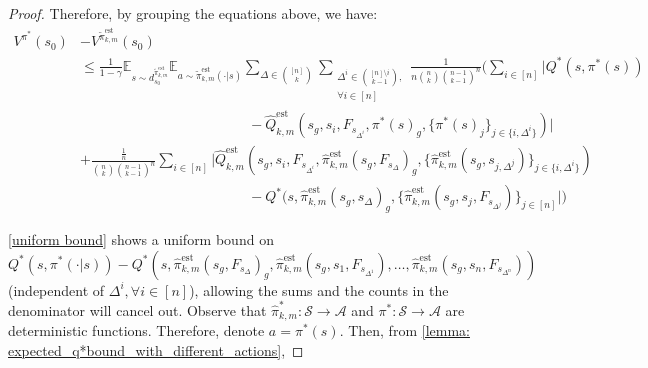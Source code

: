 \documentclass{article}
\theoremstyle{plain}
\theoremstyle{definition}
\def\est{\mathrm{est}}
\def\E{\mathbb{E}}
\begin{document}
\begin{proof}
Therefore, by grouping the equations above, we have:
\begin{align*}
    V^{\pi^*}(s_0) &- V^{\tilde{\pi}_{k,m}^\est}(s_0)\\
    &\leq \frac{1}{1-\gamma}\E_{s\sim d_{s_0}^{\tilde{\pi}_{k,m}^\est}}\E_{a\sim \tilde{\pi}_{k,m}^\est(\cdot|s)}\sum_{\Delta\in{[n]\choose k}}\sum_{\substack{\Delta^i \in {[n]\setminus i \choose k-1},\\ \forall i\in[n]}}\frac{1}{n {n\choose k} {n-1\choose k-1}^n}\bigg(\sum_{i\in[n]}\bigg|Q^*(s, \pi^*(s)) \\
    &\quad\quad\quad\quad\quad\quad\quad\quad\quad\quad\quad\quad - \hat{Q}^\est_{k,m}(s_g, s_{i},F_{s_{\Delta^i}}, \pi^*(s)_g, \{\pi^*(s)_j\}_{j\in\{i,\Delta^i\}})\bigg| \\
    &+ \frac{\frac{1}{n}}{{n\choose k} {n-1\choose k-1}^n}\sum_{i\in[n]}\bigg|\hat{Q}_{k,m}^\est(s_g, s_{i},F_{s_{\Delta^i}}, \hat{\pi}_{k,m}^\est(s_g,F_{s_\Delta})_g, \{\hat{\pi}_{k,m}^\est(s_g, s_{j,\Delta^j})\}_{j\in\{i,\Delta^i\}}) \\
    &\quad\quad\quad\quad\quad\quad\quad\quad\quad\quad\quad\quad- Q^*(s, \hat{\pi}_{k,m}^\est (s_g,s_\Delta)_g, \{\hat{\pi}_{k,m}^\est (s_g, s_{j},F_{s_{\Delta^j}})\}_{j\in[n]}\bigg|\bigg)
\end{align*}

\cref{uniform bound} shows a uniform bound on \[Q^*(s,\pi^*(\cdot|s))-Q^*(s, \hat{\pi}_{k,m}^\est(s_g,F_{s_\Delta})_g, \hat{\pi}_{k,m}^\est(s_g, s_{1},F_{s_{\Delta^1}}),\dots,\hat{\pi}_{k,m}^\est(s_g, s_{n},F_{s_{\Delta^n}}))\]
(independent of $\Delta^i, \forall i\in[n]$), allowing the sums and the counts in the denominator will cancel out. Observe that $\hat{\pi}_{k,m}^*:\mathcal{S}\to \mathcal{A}$ and $\pi^*:\mathcal{S}\to \mathcal{A}$ are deterministic functions. Therefore, denote $a = \pi^*(s)$. Then, from \cref{lemma: expected_q*bound_with_different_actions}, 


\end{proof}
\end{document}
